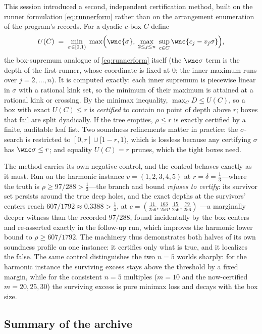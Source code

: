 This session introduced a second, independent certification method,
built on the runner formulation \eqref{eq:runnerform} rather than on
the arrangement enumeration of the program's records. For a dyadic
$c$-box $C$ define
\[
U(C)\;=\;\min_{\sigma\in[0,1)}\;
\max\Bigl(\wnc{\sigma},\;\max_{2\le j\le n}\;
\sup_{c\in C}\wnc{c_j-v_j\sigma}\Bigr),
\]
the box-supremum analogue of \eqref{eq:runnerform} itself (the
$\wnc\sigma$ term is the depth of the first runner, whose coordinate is
fixed at $0$; the inner maximum runs over $j=2,\dots,n$). It is
computed exactly: each inner supremum is piecewise linear in $\sigma$
with a rational kink set, so the minimum of their maximum is attained at
a rational kink or crossing. By the minimax inequality,
$\max_C D\le U(C)$, so a box with exact $U(C)\le r$ is \emph{certified}
to contain no point of depth above $r$; boxes that fail are split
dyadically. If the tree empties, $\rho\le r$ is exactly certified by a
finite, auditable leaf list. Two soundness refinements matter in
practice: the $\sigma$-search is restricted to
$[0,r]\cup[1-r,1)$, which is lossless because any certifying $\sigma$
has $\wnc\sigma\le r$; and equality $U(C)=r$ prunes, which the tight
boxes need.

The method carries its own negative control, and the control behaves
exactly as it must. Run on the harmonic instance $v=(1,2,3,4,5)$ at
$r=\delta=\tfrac13$---where the truth is $\rho\ge97/288>\tfrac13$---the
branch and bound \emph{refuses to certify}: its survivor set persists
around the true deep holes, and the exact depths at the survivors'
centers reach $607/1792\approx0.3388>\tfrac13$, at
$c=(\tfrac{11}{256},\tfrac{163}{256},\tfrac{15}{256},\tfrac{79}{256})$
---a marginally deeper witness than the recorded $97/288$, found
incidentally by the box centers and re-asserted exactly in the follow-up
run, which improves the harmonic lower bound to $\rho\ge607/1792$. The machinery thus demonstrates both halves of its own
soundness profile on one instance: it certifies only what is true, and
it localizes the false. The same control distinguishes the two
$n=5$ worlds sharply: for the harmonic instance the surviving excess
stays above the threshold by a fixed margin, while for the consistent
$n=5$ multiples ($m=10$ and the now-certified $m=20,25,30$) the
surviving excess is pure minimax loss and decays with the box size.

\subsection{Summary of the archive}

